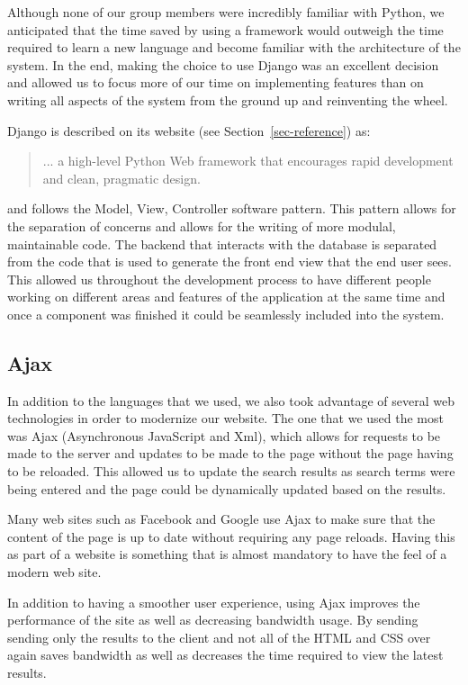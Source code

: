 \documentclass[11pt]{article}
\begin{document}
Although none of our group members were incredibly familiar with
Python, we anticipated that the time saved by using a framework would
outweigh the time required to learn a new language and become familiar
with the architecture of the system. In the end, making the choice to
use Django was an excellent decision and allowed us to focus more of
our time on implementing features than on writing all aspects of the
system from the ground up and reinventing the wheel.

Django is described on its website (see Section~\vref{sec-reference})
as:

\begin{quotation}
  ... a high-level Python Web framework that encourages rapid
  development and clean, pragmatic design.
\end{quotation}

and follows the Model, View, Controller software pattern. This pattern
allows for the separation of concerns and allows for the writing of
more modulal, maintainable code. The backend that interacts with the
database is separated from the code that is used to generate the front
end view that the end user sees. This allowed us throughout the
development process to have different people working on different
areas and features of the application at the same time and once a
component was finished it could be seamlessly included into the
system.


\subsection{Ajax}
\label{sec-ajax}

In addition to the languages that we used, we also took advantage of
several web technologies in order to modernize our website. The one
that we used the most was Ajax (Asynchronous JavaScript and Xml),
which allows for requests to be made to the server and updates to be
made to the page without the page having to be reloaded. This allowed
us to update the search results as search terms were being entered and
the page could be dynamically updated based on the results.

Many web sites such as Facebook and Google use Ajax to make sure that
the content of the page is up to date without requiring any page
reloads. Having this as part of a website is something that is almost
mandatory to have the feel of a modern web site.

In addition to having a smoother user experience, using Ajax improves
the performance of the site as well as decreasing bandwidth usage. By
sending sending only the results to the client and not all of the HTML
and CSS over again saves bandwidth as well as decreases the time
required to view the latest results. 
\end{document}
